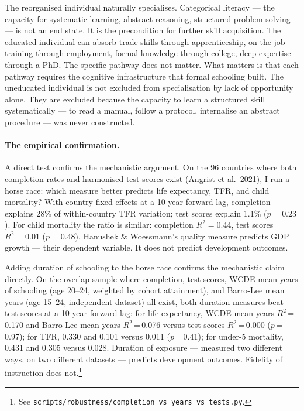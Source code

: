 \documentclass[12pt,letterpaper]{article}
\begin{document}
The reorganised individual naturally specialises. Categorical literacy
--- the capacity for systematic learning, abstract reasoning, structured
problem-solving --- is not an end state. It is the precondition for
further skill acquisition. The educated individual can absorb trade
skills through apprenticeship, on-the-job training through employment,
formal knowledge through college, deep expertise through a PhD. The
specific pathway does not matter. What matters is that each pathway
requires the cognitive infrastructure that formal schooling built. The
uneducated individual is not excluded from specialisation by lack of
opportunity alone. They are excluded because the capacity to learn a
structured skill systematically --- to read a manual, follow a protocol,
internalise an abstract procedure --- was never constructed.

\paragraph{The empirical confirmation.}

A direct test confirms the mechanistic argument. On the 96 countries
where both completion rates and harmonised test scores exist (Angrist et
al.~2021), I run a horse race: which measure better predicts life
expectancy, TFR, and child mortality? With country fixed effects at a
10-year forward lag, completion explains 28\% of within-country TFR
variation; test scores explain 1.1\% ($p = 0.23$). For child mortality
the ratio is similar: completion $R^2 = 0.44$, test scores $R^2 = 0.01$
($p = 0.48$). Hanushek \& Woessmann's quality measure predicts GDP
growth --- their dependent variable. It does not predict development
outcomes.

Adding duration of schooling to the horse race confirms the mechanistic
claim directly. On the overlap sample where completion, test scores,
WCDE mean years of schooling (age 20--24, weighted by cohort
attainment), and Barro-Lee mean years (age 15--24, independent dataset)
all exist, both duration measures beat test scores at a 10-year forward
lag: for life expectancy, WCDE mean years $R^2$\,=\,0.170 and Barro-Lee
mean years $R^2$\,=\,0.076 versus test scores $R^2$\,=\,0.000
($p$\,=\,0.97); for TFR, 0.330 and 0.101 versus 0.011 ($p$\,=\,0.41);
for under-5 mortality, 0.431 and 0.305 versus 0.028. Duration of
exposure --- measured two different ways, on two different datasets ---
predicts development outcomes. Fidelity of instruction does not.\footnote{See
\texttt{scripts/robustness/completion\_vs\_years\_vs\_tests.py}.}
\end{document}
